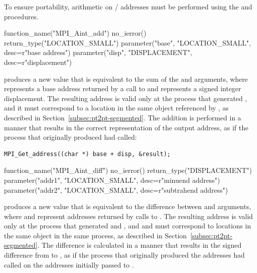 To ensure portability, arithmetic on \MPI/ addresses must be
performed using the 
and  procedures.

%
\begin{mpi-binding}
    function_name("MPI_Aint_add")
    no_ierror()
    return_type("LOCATION_SMALL")
    parameter("base", "LOCATION_SMALL", desc=r"base address")
    parameter("disp", "DISPLACEMENT", desc=r"displacement")
\end{mpi-binding}

 produces a new  value that is
equivalent to the sum of the  and  arguments, where
 represents a base address returned by a call to
 and  represents a signed integer
displacement. The resulting address is valid only at the process that generated
, and it must correspond to a location in the same object
referenced by , as described in
Section~\ref{subsec:pt2pt-segmented}. The addition is performed in a manner
that results in the correct  representation of the output
address, as if the process that originally produced  had called:
\begin{lstlisting}[language={[MPI]C}]
MPI_Get_address((char *) base + disp, &result);
\end{lstlisting}

%
\begin{mpi-binding}
    function_name("MPI_Aint_diff")
    no_ierror()
    return_type("DISPLACEMENT")
    parameter("addr1", "LOCATION_SMALL", desc=r"minuend address")
    parameter("addr2", "LOCATION_SMALL", desc=r"subtrahend address")
\end{mpi-binding}

 produces a new  value that is
equivalent to the difference between  and 
arguments, where  and  represent addresses returned
by calls to .  The resulting address is valid only
at the process that generated  and , and
 and  must correspond to locations in the same
object in the same process, as described in
Section~\ref{subsec:pt2pt-segmented}. The difference is calculated in a manner
that results in
the signed difference from  to , as if
the process that originally produced the addresses had called
on the addresses initially passed to .

